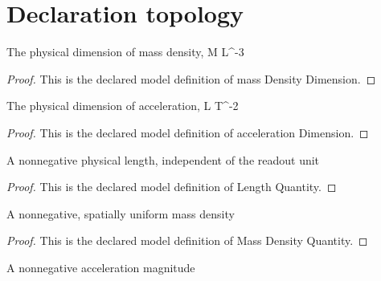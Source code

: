 \section{Declaration topology}
\begin{definition}
  \label{def:physics:phyx-mini-0665:phyxminiproblems-problemphyxmini0665-massdensitydimension}
  The physical dimension of mass density, M L\textasciicircum{}-3
\end{definition}
\begin{proof}
  This is the declared model definition of mass Density Dimension.
\end{proof}
\begin{definition}
  \label{def:physics:phyx-mini-0665:phyxminiproblems-problemphyxmini0665-accelerationdimension}
  The physical dimension of acceleration, L T\textasciicircum{}-2
\end{definition}
\begin{proof}
  This is the declared model definition of acceleration Dimension.
\end{proof}
\begin{definition}
  \label{def:physics:phyx-mini-0665:phyxminiproblems-problemphyxmini0665-lengthquantity}
  A nonnegative physical length, independent of the readout unit
\end{definition}
\begin{proof}
  This is the declared model definition of Length Quantity.
\end{proof}
\begin{definition}
  \label{def:physics:phyx-mini-0665:phyxminiproblems-problemphyxmini0665-massdensityquantity}
  A nonnegative, spatially uniform mass density
\end{definition}
\begin{proof}
  This is the declared model definition of Mass Density Quantity.
\end{proof}
\begin{definition}
  \label{def:physics:phyx-mini-0665:phyxminiproblems-problemphyxmini0665-accelerationquantity}
  A nonnegative acceleration magnitude
\end{definition}
